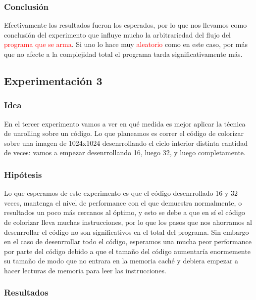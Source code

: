 \medskip

\subsubsection{Conclusión}
\par{Efectivamente los resultados fueron los esperados, por lo que nos llevamos como conclusión del experimento que influye mucho la arbitrariedad del flujo del \textcolor{red}{programa que se arma}. Si uno lo hace muy \textcolor{red}{aleatorio} como en este caso, por más que no afecte a la complejidad total el programa tarda significativamente más.}

\subsection{Experimentación 3}

\subsubsection{Idea}
\par{En el tercer experimento vamos a ver en qué medida es mejor aplicar la técnica de unrolling sobre un código. Lo que planeamos es correr el código de colorizar sobre una imagen de 1024x1024 desenrrollando el ciclo interior distinta cantidad de veces: vamos a empezar desenrrollando 16, luego 32, y luego completamente.}

	   
\subsubsection{Hipótesis}
\par{Lo que esperamos de este experimento es que el código desenrrollado 16 y 32 veces, mantenga el nivel de performance con el que demuestra normalmente, o resultados un poco más cercanos al óptimo, y esto se debe a que en sí el código de colorizar lleva muchas instrucciones, por lo que los pasos que nos ahorramos al desenrrollar el código no son significativos en el total del programa. Sin embargo en el caso de desenrrollar todo el código, esperamos una mucha peor performance por parte del código debido a que el tamaño del código aumentaría enormemente su tamaño de modo que no entrara en la memoria caché y debiera empezar a hacer lecturas de memoria para leer las instrucciones.}
	
\subsubsection{Resultados}

